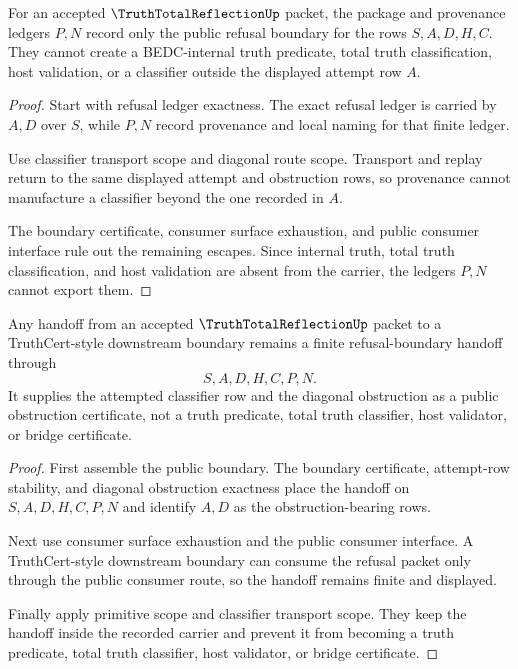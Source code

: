 \begin{theorem}
\label{thm:truth-total-reflection-ledger-nonescape}
For an accepted $\TruthTotalReflectionUp$ packet, the package and provenance
ledgers $P,N$ record only the public refusal boundary for the rows
$S,A,D,H,C$. They cannot create a BEDC-internal truth predicate, total truth
classification, host validation, or a classifier outside the displayed attempt
row $A$.
\end{theorem}
\begin{proof}
Start with refusal ledger exactness. The exact refusal ledger is carried by
$A,D$ over $S$, while $P,N$ record provenance and local naming for that finite
ledger.

Use classifier transport scope and diagonal route scope. Transport and replay
return to the same displayed attempt and obstruction rows, so provenance cannot
manufacture a classifier beyond the one recorded in $A$.

The boundary certificate, consumer surface exhaustion, and public consumer
interface rule out the remaining escapes. Since internal truth, total truth
classification, and host validation are absent from the carrier, the ledgers
$P,N$ cannot export them.
\end{proof}

\begin{theorem}
\label{thm:truth-total-reflection-truthcert-handoff}
Any handoff from an accepted $\TruthTotalReflectionUp$ packet to a
TruthCert-style downstream boundary remains a finite refusal-boundary handoff
through
$$
S,A,D,H,C,P,N.
$$
It supplies the attempted classifier row and the diagonal obstruction as a
public obstruction certificate, not a truth predicate, total truth classifier,
host validator, or bridge certificate.
\end{theorem}
\begin{proof}
First assemble the public boundary. The boundary certificate, attempt-row
stability, and diagonal obstruction exactness place the handoff on
$S,A,D,H,C,P,N$ and identify $A,D$ as the obstruction-bearing rows.

Next use consumer surface exhaustion and the public consumer interface. A
TruthCert-style downstream boundary can consume the refusal packet only through
the public consumer route, so the handoff remains finite and displayed.

Finally apply primitive scope and classifier transport scope. They keep the
handoff inside the recorded carrier and prevent it from becoming a truth
predicate, total truth classifier, host validator, or bridge certificate.
\end{proof}


